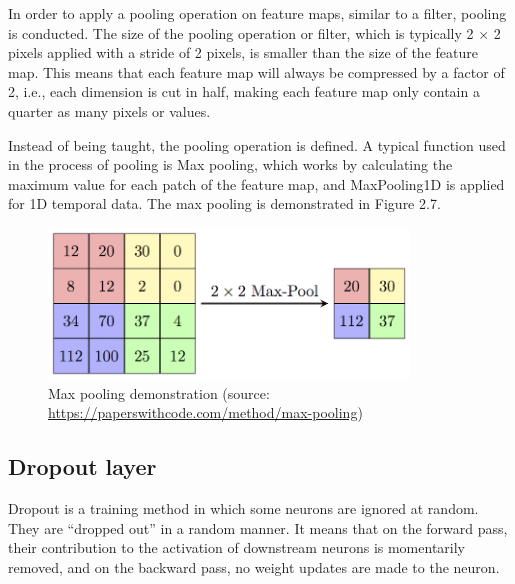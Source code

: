 In order to apply a pooling operation on feature maps, similar to a filter, pooling is conducted. The size of the pooling operation or filter, which is typically 2 $\times$ 2 pixels applied with a stride of 2 pixels, is smaller than the size of the feature map. This means that each feature map will always be compressed by a factor of 2, i.e., each dimension is cut in half, making each feature map only contain a quarter as many pixels or values.

Instead of being taught, the pooling operation is defined. A typical function used in the process of pooling is Max pooling, which works by calculating the maximum value for each patch of the feature map, and MaxPooling1D is applied for 1D temporal data. The max pooling is demonstrated in Figure 2.7.

\begin{figure}[!h]
	\centering
	\includegraphics[width=\linewidth, height=4cm,keepaspectratio]{figures/maxpooling.png}
   \caption{Max pooling demonstration (source: \url{https://paperswithcode.com/method/max-pooling})}
\end{figure}

\subsection{Dropout layer}
\hspace{0.5cm}Dropout is a training method in which some neurons are ignored at random. They are ``dropped out'' in a random manner. It means that on the forward pass, their contribution to the activation of downstream neurons is momentarily removed, and on the backward pass, no weight updates are made to the neuron.

